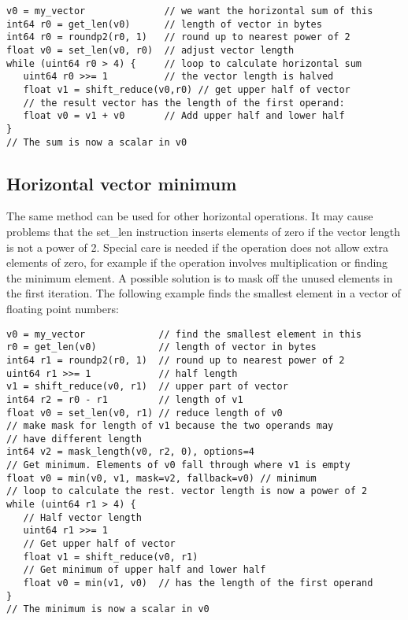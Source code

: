 \documentclass[forwardcom.tex]{subfiles}
\begin{document}
\begin{example}
\label{exampleHorizontalAdd}
\end{example} %
\begin{lstlisting}[frame=single]
v0 = my_vector              // we want the horizontal sum of this
int64 r0 = get_len(v0)      // length of vector in bytes
int64 r0 = roundp2(r0, 1)   // round up to nearest power of 2
float v0 = set_len(v0, r0)  // adjust vector length
while (uint64 r0 > 4) {     // loop to calculate horizontal sum
   uint64 r0 >>= 1          // the vector length is halved
   float v1 = shift_reduce(v0,r0) // get upper half of vector
   // the result vector has the length of the first operand:
   float v0 = v1 + v0       // Add upper half and lower half
}
// The sum is now a scalar in v0
\end{lstlisting}
\vspace{4mm}


\subsection{Horizontal vector minimum} \label{horizontalVectorMin}
The same method can be used for other horizontal operations. It may cause problems that the set\_len instruction inserts elements of zero if the vector length is not a power of 2. Special care is needed if the operation does not allow extra elements of zero, for example if the operation involves multiplication or finding the minimum element. A possible solution is to mask off the unused elements in the first iteration. The following example finds the smallest element in a vector of floating point numbers:

\begin{example}
\label{exampleHorizontalMin}
\end{example}
\begin{lstlisting}[frame=single]
v0 = my_vector             // find the smallest element in this
r0 = get_len(v0)           // length of vector in bytes
int64 r1 = roundp2(r0, 1)  // round up to nearest power of 2
uint64 r1 >>= 1            // half length
v1 = shift_reduce(v0, r1)  // upper part of vector
int64 r2 = r0 - r1         // length of v1
float v0 = set_len(v0, r1) // reduce length of v0
// make mask for length of v1 because the two operands may 
// have different length
int64 v2 = mask_length(v0, r2, 0), options=4
// Get minimum. Elements of v0 fall through where v1 is empty
float v0 = min(v0, v1, mask=v2, fallback=v0) // minimum
// loop to calculate the rest. vector length is now a power of 2
while (uint64 r1 > 4) {
   // Half vector length
   uint64 r1 >>= 1
   // Get upper half of vector
   float v1 = shift_reduce(v0, r1)
   // Get minimum of upper half and lower half
   float v0 = min(v1, v0)  // has the length of the first operand
}
// The minimum is now a scalar in v0
\end{lstlisting}
\vspace{4mm}
\end{document}
